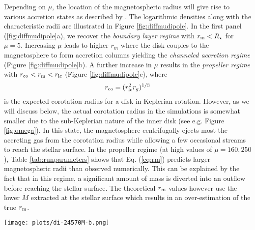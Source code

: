 \documentclass[fleqn,usenatbib]{mnras}
\begin{document}
Depending on $\mu$, the location of the magnetospheric radius will give rise to various accretion states as described by . The logarithmic densities along with the characteristic radii are illustrated in Figure \ref{fig:diffmudipole}.
In the first panel (\ref{fig:diffmudipole}a), we recover the \textit{boundary layer regime} with $r_{\rm m}<R_{\star}$ for $\mu=5$.  
Increasing $\mu$ leads to higher $r_m$ where the disk couples to the magnetosphere to form accretion columns yielding the \textit{channeled accretion regime} (Figure \ref{fig:diffmudipole}b). 
A further increase in $\mu$ results in the \textit{propeller regime} with $r_{\rm co} < r_{\rm m} < r_{\rm lc}$ (Figure \ref{fig:diffmudipole}c), where 
\begin{align}
    r_{\rm co} = (r_{\rm lc}^2 r_g)^{1/3} \label{eq:corotation}
\end{align} 
is the expected corotation radius for a disk in Keplerian rotation. However, as we will discuss below, the actual corotation radius in the simulations is somewhat smaller due to the sub-Keplerian nature of the inner disk (see e.g. Figure \ref{fig:omega}). 
In this state, the magnetosphere centrifugally ejects most the accreting gas from the corotation radius while allowing a few occasional streams to reach the stellar surface.  
In the propeller regime (at high values of $\mu=160,250$), Table \ref{tab:runparameters} shows that Eq. (\ref{eq:rm}) predicts larger magnetospheric radii than observed numerically.  This can be explained by the fact that in this regime, a significant amount of mass is diverted into an outflow before reaching the stellar surface.  The theoretical $r_{\rm m}$ values however use the lower $\dot{M}$ extracted at the stellar surface which results in an over-estimation of the true $r_{\rm m}$.
%
\begin{figure*}
   \centering
     \texttt{[image: plots/di-24570M-b.png]}%
     \caption{Different accretion regimes depending upon magnetic strength of the star for angular frequency of $\Omega=0.03$ in the quasi stationary state at $t = 19000r_g/c$. (a) Boundary layer, (b) channeled accretion and (c) Propeller regime. The solid and dashed lines represent the light cylinder radius and the corotation radius respectively. The pink lines show the last closed fieldline for respective isolated pulsars.}%
    \label{fig:diffmudipole}
    \vspace{-4mm}
\end{figure*}
\end{document}
